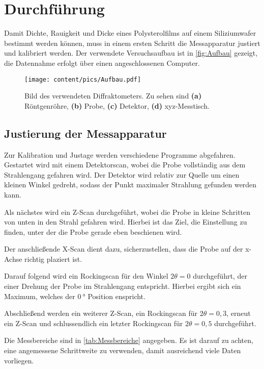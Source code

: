 \section{Durchführung}
\label{sec:Durchführung}
Damit Dichte, Rauigkeit und Dicke eines Polysterolfilms auf einem Siliziumwafer bestimmt werden können, muss in einem ersten Schritt die Messapparatur
justiert und kalibriert werden.
Der verwendete Versuchsaufbau ist in \autoref{fig:Aufbau} gezeigt, die Datennahme erfolgt über einen angeschlossenen Computer.

\begin{figure}
    \centering
    \texttt{[image: content/pics/Aufbau.pdf]}
    \caption{Bild des verwendeten Diffraktometers. Zu sehen sind \textbf{(a)} Röntgenröhre, \textbf{(b)} Probe, \textbf{(c)} Detektor, \textbf{(d)} xyz-Messtisch.}
    \label{fig:Aufbau}
\end{figure}

\subsection{Justierung der Messapparatur}
Zur Kalibration und Justage werden verschiedene Programme abgefahren. Gestartet wird mit einem Detektorscan, wobei die Probe vollständig aus dem Strahlengang
gefahren wird. Der Detektor wird relativ zur Quelle um einen kleinen Winkel gedreht, sodass der Punkt maximaler Strahlung gefunden werden kann.

Als nächstes wird ein Z-Scan durchgeführt, wobei die Probe in kleine Schritten von unten in den Strahl gefahren wird. Hierbei ist das Ziel, die Einstellung
zu finden, unter der die Probe gerade eben beschienen wird.

Der anschließende X-Scan dient dazu, sicherzustellen, dass die Probe auf der x-Achse richtig plaziert ist.

Darauf folgend wird ein Rockingscan für den Winkel $2\theta = 0$ durchgeführt, der einer Drehung der Probe im Strahlengang entspricht. Hierbei ergibt sich ein Maximum, welches 
der $\qty{0}{\degree}$ Position enspricht.

Abschließend werden ein weiterer Z-Scan, ein Rockingscan für $2\theta = 0,3$, erneut ein Z-Scan und schlussendlich ein letzter Rockingscan für $2\theta = 0,5$ durchgeführt.

Die Messbereiche sind in \autoref{tab:Messbereiche} angegeben. Es ist darauf zu achten, eine angemessene Schrittweite zu verwenden, damit ausreichend viele Daten
vorliegen.

